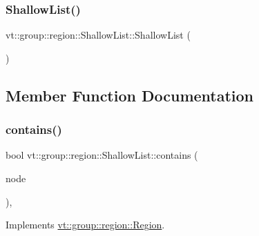 \subsubsection{\texorpdfstring{Shallow\+List()}{ShallowList()}\hspace{0.1cm}{\footnotesize\ttfamily [5/5]}}
{\footnotesize\ttfamily vt\+::group\+::region\+::\+Shallow\+List\+::\+Shallow\+List (\begin{DoxyParamCaption}\item[{\hyperlink{structvt_1_1group_1_1region_1_1_shallow_list}{Shallow\+List} \&\&}]{ }\end{DoxyParamCaption})\hspace{0.3cm}{\ttfamily [default]}}



\subsection{Member Function Documentation}
\mbox{\label{structvt_1_1group_1_1region_1_1_shallow_list_a58313e5cab61f196ff5fb1d6ac109d1c}} 
\subsubsection{\texorpdfstring{contains()}{contains()}}
{\footnotesize\ttfamily bool vt\+::group\+::region\+::\+Shallow\+List\+::contains (\begin{DoxyParamCaption}\item[{\hyperlink{namespacevt_a866da9d0efc19c0a1ce79e9e492f47e2}{Node\+Type} const \&}]{node }\end{DoxyParamCaption})\hspace{0.3cm}{\ttfamily [override]}, {\ttfamily [virtual]}}



Implements \hyperlink{structvt_1_1group_1_1region_1_1_region_a1e0ebd7367476fb397faf06a03b5583c}{vt\+::group\+::region\+::\+Region}.

\mbox{\label{structvt_1_1group_1_1region_1_1_shallow_list_a43434547454d02f9069873282675058f}} 
